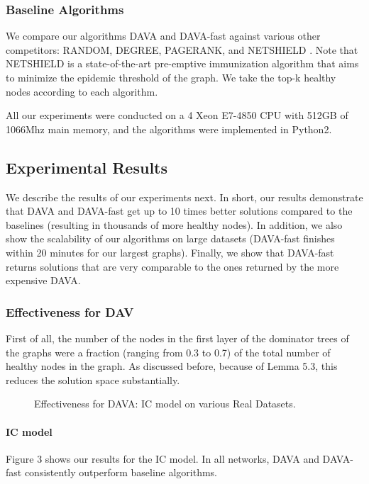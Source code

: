 \documentclass{article}
\begin{document}
\subsubsection{Baseline Algorithms}

We compare our algorithms DAVA and DAVA-fast against various other competitors: RANDOM, DEGREE, PAGERANK, and NETSHIELD \cite{ref2}. Note that NETSHIELD is a state-of-the-art pre-emptive immunization algorithm that aims to minimize the epidemic threshold of the graph. We take the top-k healthy nodes according to each algorithm.

All our experiments were conducted on a 4 Xeon E7-4850 CPU with 512GB of 1066Mhz main memory, and the algorithms were implemented in Python2.

\subsection{Experimental Results}

We describe the results of our experiments next. In short, our results demonstrate that DAVA and DAVA-fast get up to 10 times better solutions compared to the baselines (resulting in thousands of more healthy nodes). In addition, we also show the scalability of our algorithms on large datasets (DAVA-fast finishes within 20 minutes for our largest graphs). Finally, we show that DAVA-fast returns solutions that are very comparable to the ones returned by the more expensive DAVA.

\subsubsection{Effectiveness for DAV}

First of all, the number of the nodes in the first layer of the dominator trees of the graphs were a fraction (ranging from 0.3 to 0.7) of the total number of healthy nodes in the graph. As discussed before, because of Lemma 5.3, this reduces the solution space substantially.

\begin{figure}[h!]
    \centering
    \caption{Effectiveness for DAVA: IC model on various Real Datasets.}
\end{figure}

\paragraph{IC model} Figure 3 shows our results for the IC model. In all networks, DAVA and DAVA-fast consistently outperform baseline algorithms.
\end{document}
